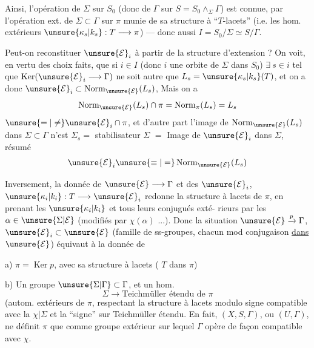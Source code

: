 
Ainsi, l'opération de
$\Sigma$ sur $S_0$ (donc de $\Gamma$ sur $S=S_0\wedge_{\Sigma}\Gamma$)
est connue, par l'opération ext. de $\Sigma\subset\Gamma$ sur
$\pi$ munie de sa structure  à
``$T$-lacets'' (i.e. les hom. extérieurs
$\unsure{\kappa_s|k_s}:T\longrightarrow\pi$) --- donc aussi $I=S_0/\Sigma\simeq S/\Gamma$.

Peut-on reconstituer $\unsure{\mathcal E}_i$  à partir de la
structure d'extension ? On voit, 
en vertu des choix faits,
que si $i\in I$ (donc $i$ une orbite de
$\Sigma$ dans $S_0$) $\exists\ s\in i$ tel que $\operatorname{Ker}(\unsure{\mathcal E}_i\longrightarrow\Gamma)$
ne soit autre que $L_s=\unsure{\kappa_s|k_s}(T)$, et on a
donc $\unsure{\mathcal E}_i\subset\operatorname{Norm}_{\unsure{\mathcal E}}(L_s)$, Mais
on a
\[
\operatorname{Norm}_{\unsure{\mathcal E}}(L_s)\cap\pi
=\operatorname{Norm}_{\pi}(L_s)=L_s
\]
$\unsure{=|\ne}\unsure{\mathcal E}_i\cap\pi$, et d'autre part l'image de
$\operatorname{Norm}_{\unsure{\mathcal E}}(L_s)$ dans $\Sigma\subset\Gamma$ n'est  \inserted{$\unsure{\subset}$}
$\Sigma_s=$ stabilisateur   $\Sigma$
$=$ Image de $\unsure{\mathcal E}_i$ dans $\Sigma$,
  résumé
\[
\unsure{\mathcal E}_i\unsure{\equiv|=}\operatorname{Norm}_{\unsure{\mathcal E}}(L_s)
\]


Inversement, la donnée de $\unsure{\mathcal E}\longrightarrow\Gamma$
et des $\unsure{\mathcal E}_i$, $\unsure{\kappa_i|k_i}:T\longrightarrow\unsure{\mathcal E}_i$ redonne la
structure à lacets de $\pi$, en prenant
les $\unsure{\kappa_i|k_i}$ et tous leurs conjugués exté-
rieurs  par les $\alpha\in\unsure{\Sigma|\mathcal E}$ (modifiés par $\chi(\alpha)$ ...).
Donc la  situation $\unsure{\mathcal E}\xrightarrow{p}\Gamma$, $\unsure{\mathcal E}_i\subset\unsure{\mathcal E}$
 (famille de ss-groupes, chacun
 mod conjugaison \uline{dans $\unsure{\mathcal E}$}) équivaut
à la donnée de

a) $\pi=\operatorname{Ker}p$, avec sa structure à lacets
(
$T$ dans $\pi$)

b) Un  groupe $\unsure{\Sigma|\Gamma}\subset\Gamma$, et
un hom.
\[
\Sigma\longrightarrow\text{Teichmüller étendu de }\pi
\]
(autom. extérieurs de $\pi$,
respectant la structure à lacets
modulo signe
compatible avec la  $\chi|\Sigma$ et
la  ``signe'' sur Teichmüller étendu.
En fait, $(X,S,\Gamma)$, ou $(U,\Gamma)$, ne définit
$\pi$ que comme groupe extérieur  sur lequel
$\Gamma$ opère de façon compatible avec $\chi$.
